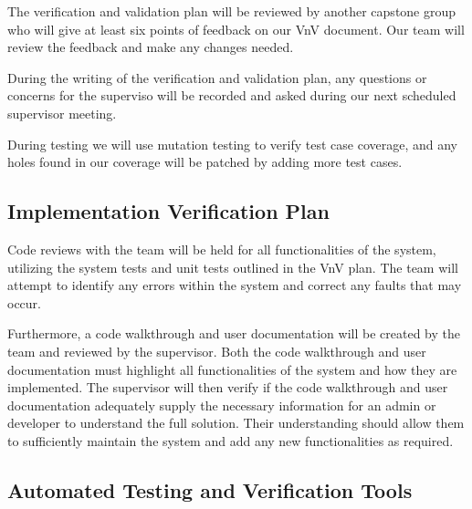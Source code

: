 \documentclass[12pt, titlepage]{article}
\begin{document}

The verification and validation plan will be reviewed by another capstone
group who will give at least six points of feedback on our VnV document. Our
team will review the feedback and make any changes needed. 

During the writing of the verification and validation plan, any questions or
concerns for the superviso will be recorded and asked during our next
scheduled supervisor meeting.

During testing we will use mutation testing to verify test case coverage, and
any holes found in our coverage will be patched by adding more test cases.

\subsection{Implementation Verification Plan}




Code reviews with the team will be held for all functionalities of the system, utilizing the
system tests and unit tests outlined in the VnV plan. The team will attempt to identify any
errors within the system and correct any faults that may occur.

Furthermore, a code walkthrough and user documentation will be created by the team and
reviewed by the supervisor. Both the code walkthrough and user documentation must highlight
all functionalities of the system and how they are implemented. The supervisor will then
verify if the code walkthrough and user documentation adequately supply the necessary
information for an admin or developer to understand the full solution. Their understanding
should allow them to sufficiently maintain the system and add any new functionalities as
required.

\subsection{Automated Testing and Verification Tools}
\end{document}

